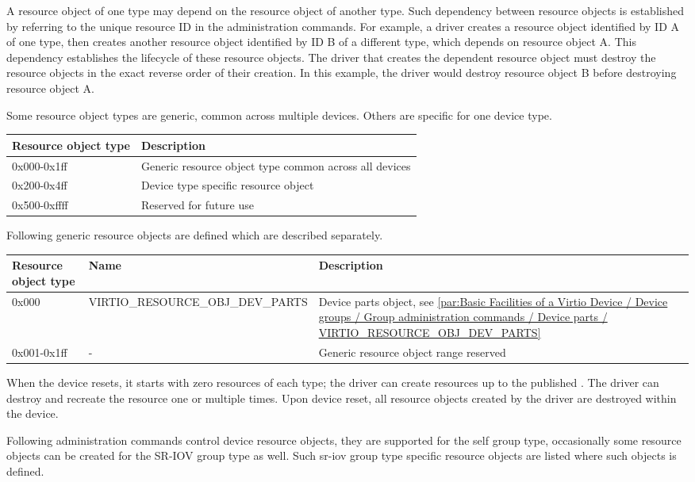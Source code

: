A resource object of one type may depend on the resource object of another type.
Such dependency between resource objects is established by referring to the unique
resource ID in the administration commands. For example, a driver creates a
resource object identified by ID A of one type, then creates another resource
object identified by ID B of a different type, which depends on resource object
A. This dependency establishes the lifecycle of these resource objects. The driver
that creates the dependent resource object must destroy the resource objects in the
exact reverse order of their creation. In this example, the driver would
destroy resource object B before destroying resource object A.

Some resource object types are generic, common across multiple devices.
Others are specific for one device type.

\begin{tabular}{|l|l|}
\hline
Resource object type & Description \\
\hline \hline
0x000-0x1ff & Generic resource object type common across all devices \\
\hline
0x200-0x4ff & Device type specific resource object \\
\hline
0x500-0xffff & Reserved for future use  \\
\hline
\end{tabular}

Following generic resource objects are defined which are described separately.

\begin{xltabular}{\textwidth}{ |X||X|X| }
\hline
Resource object type & Name & Description \\
\hline \hline
0x000 & VIRTIO_RESOURCE_OBJ_DEV_PARTS & Device parts object, see \ref{par:Basic Facilities of a Virtio Device / Device groups / Group administration commands / Device parts / VIRTIO_RESOURCE_OBJ_DEV_PARTS} \\
\hline
0x001-0x1ff & - & Generic resource object range reserved \\
\hline
\hline
\end{xltabular}

When the device resets, it starts with zero resources of each type; the driver
can create resources up to the published . The driver can
destroy and recreate the resource one or multiple times. Upon device reset,
all resource objects created by the driver are destroyed within the device.

Following administration commands control device resource objects,
they are supported for the self group type, occasionally some resource
objects can be created for the SR-IOV group type as well. Such sr-iov group
type specific resource objects are listed where such objects is defined.

